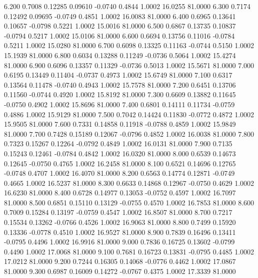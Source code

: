    6.200   0.7008   0.12285   0.09610  -0.0740   0.4844   1.0002  16.0255  81.0000
   6.300   0.7174   0.12492   0.09695  -0.0749   0.4851   1.0002  16.0083  81.0000
   6.400   0.6965   0.13641   0.10657  -0.0798   0.5221   1.0002  15.0016  81.0000
   6.500   0.6867   0.13735   0.10837  -0.0794   0.5217   1.0002  15.0106  81.0000
   6.600   0.6694   0.13756   0.11016  -0.0784   0.5211   1.0002  15.0280  81.0000
   6.700   0.6098   0.13325   0.11163  -0.0744   0.5150   1.0002  15.1939  81.0000
   6.800   0.6034   0.13288   0.11249  -0.0736   0.5064   1.0002  15.4274  81.0000
   6.900   0.6096   0.13357   0.11329  -0.0736   0.5013   1.0002  15.5671  81.0000
   7.000   0.6195   0.13449   0.11404  -0.0737   0.4973   1.0002  15.6749  81.0000
   7.100   0.6317   0.13564   0.11478  -0.0740   0.4943   1.0002  15.7578  81.0000
   7.200   0.6451   0.13706   0.11560  -0.0744   0.4920   1.0002  15.8192  81.0000
   7.300   0.6609   0.13882   0.11645  -0.0750   0.4902   1.0002  15.8696  81.0000
   7.400   0.6801   0.14111   0.11734  -0.0759   0.4886   1.0002  15.9129  81.0000
   7.500   0.7042   0.14424   0.11830  -0.0772   0.4872   1.0002  15.9505  81.0000
   7.600   0.7331   0.14858   0.11918  -0.0788   0.4859   1.0002  15.9849  81.0000
   7.700   0.7428   0.15189   0.12067  -0.0796   0.4852   1.0002  16.0038  81.0000
   7.800   0.7323   0.15267   0.12264  -0.0792   0.4849   1.0002  16.0131  81.0000
   7.900   0.7135   0.15243   0.12461  -0.0784   0.4842   1.0002  16.0320  81.0000
   8.000   0.6539   0.14673   0.12645  -0.0750   0.4765   1.0002  16.2458  81.0000
   8.100   0.6521   0.14696   0.12765  -0.0748   0.4707   1.0002  16.4070  81.0000
   8.200   0.6563   0.14774   0.12871  -0.0749   0.4665   1.0002  16.5237  81.0000
   8.300   0.6633   0.14868   0.12967  -0.0750   0.4629   1.0002  16.6230  81.0000
   8.400   0.6728   0.14977   0.13053  -0.0752   0.4597   1.0002  16.7097  81.0000
   8.500   0.6851   0.15110   0.13129  -0.0755   0.4570   1.0002  16.7853  81.0000
   8.600   0.7009   0.15284   0.13197  -0.0759   0.4547   1.0002  16.8507  81.0000
   8.700   0.7217   0.15534   0.13262  -0.0766   0.4526   1.0002  16.9063  81.0000
   8.800   0.7499   0.15920   0.13336  -0.0778   0.4510   1.0002  16.9527  81.0000
   8.900   0.7839   0.16496   0.13411  -0.0795   0.4496   1.0002  16.9916  81.0000
   9.000   0.7836   0.16725   0.13602  -0.0799   0.4490   1.0002  17.0068  81.0000
   9.100   0.7681   0.16723   0.13831  -0.0795   0.4485   1.0002  17.0212  81.0000
   9.200   0.7244   0.16305   0.14068  -0.0776   0.4462   1.0002  17.0867  81.0000
   9.300   0.6987   0.16009   0.14272  -0.0767   0.4375   1.0002  17.3339  81.0000

